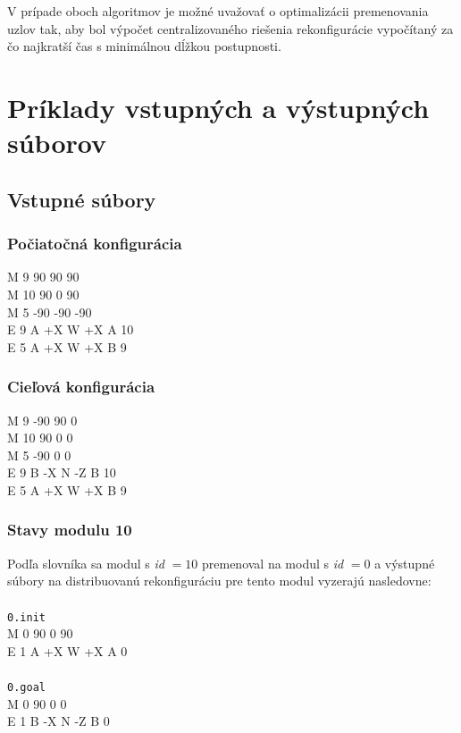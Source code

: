\documentclass[
  digital, %
  oneside, %
  notable,   %
  lof,     %
  nolot,     %
]{fithesis3}
\begin{document}
V prípade oboch algoritmov je možné uvažovať o optimalizácii premenovania uzlov tak, aby bol výpočet centralizovaného riešenia rekonfigurácie vypočítaný za čo najkratší čas s minimálnou dĺžkou postupnosti.


\cleardoublepage
\appendix
\chapter{Príklady vstupných a výstupných súborov}
\label{sec:inOutFiles}
\section{Vstupné súbory}
\subsection{Počiatočná konfigurácia}
M 9 90 90 90 \\
M 10 90 0 90 \\
M 5 -90 -90 -90 \\
E 9 A +X W +X A 10 \\
E 5 A +X W +X B 9

\subsection{Cieľová konfigurácia}
M 9 -90 90 0 \\
M 10 90 0 0 \\
M 5 -90 0 0 \\
E 9 B -X N -Z B 10 \\
E 5 A +X W +X B 9

\subsection{Stavy modulu 10}
\label{sec:algoInput}
Podľa slovníka sa modul s \textit{id} $= 10$ premenoval na modul s \textit{id} $= 0$ a výstupné súbory na distribuovanú rekonfiguráciu pre tento modul vyzerajú nasledovne: \\ \\
\texttt{0.init} \\
M 0 90 0 90 \\
E 1 A +X W +X A 0 \\
\\
\texttt{0.goal} \\
M 0 90 0 0 \\
E 1 B -X N -Z B 0 \\
\end{document}
